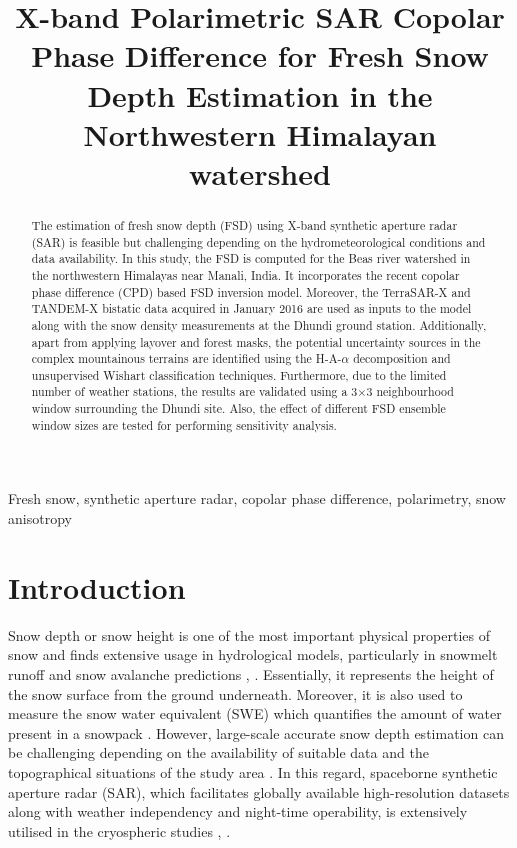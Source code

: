 \documentclass{article}
\title{X-band Polarimetric SAR Copolar Phase Difference for Fresh Snow Depth Estimation in the Northwestern Himalayan watershed}
\begin{document}
%
\maketitle
\begin{abstract}
The estimation of fresh snow depth (FSD) using X-band synthetic aperture radar (SAR) is feasible but challenging depending on the hydrometeorological conditions and data availability. In this study, the FSD is computed for the Beas river watershed in the northwestern Himalayas near Manali, India. It incorporates the recent copolar phase difference (CPD) based FSD inversion model. Moreover, the TerraSAR-X and TANDEM-X bistatic data acquired in January 2016 are used as inputs to the model along with the snow density measurements at the Dhundi ground station. Additionally, apart from applying layover and forest masks, the potential uncertainty sources in the complex mountainous terrains are identified using the H-A-$\alpha$ decomposition and unsupervised Wishart classification techniques. Furthermore, due to the limited number of weather stations, the results are validated using a 3$\times$3 neighbourhood window surrounding the Dhundi site. Also, the effect of different FSD ensemble window sizes are tested for performing sensitivity analysis.
\end{abstract}
%
\begin{keywords}
Fresh snow, synthetic aperture radar, copolar phase difference, polarimetry, snow anisotropy
\end{keywords}
%
\section{Introduction}
\label{sec:intro}
Snow depth or snow height is one of the most important physical properties of snow and finds extensive usage in hydrological models, particularly in snowmelt runoff and snow avalanche predictions \cite{Thakur2012}, \cite{Tedesco2015}. Essentially, it represents the height of the snow surface from the ground underneath. Moreover, it is also used to measure the snow water equivalent (SWE) which quantifies the amount of water present in a snowpack \cite{Tedesco2015}. However, large-scale accurate snow depth estimation can be challenging depending on the availability of suitable data and the topographical situations of the study area \cite{Leinss2014}. In this regard, spaceborne synthetic aperture radar (SAR), which facilitates globally available high-resolution datasets along with weather independency and night-time operability, is extensively utilised in the cryospheric studies \cite{Thakur2012}, \cite{Leinss2014}.
\end{document}
